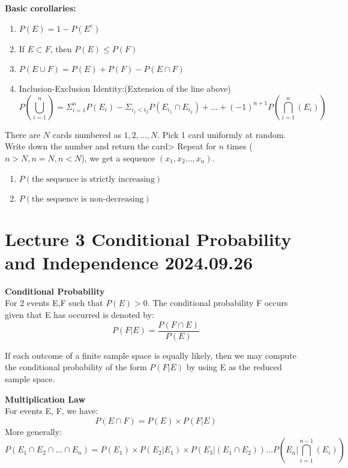 \documentclass{article}
\begin{document}
\begin{theorem}
    \textbf{Basic corollaries:}\\
    \begin{enumerate}
        \item $P(E) = 1 - P(E^c)$
        \item If $ E \subset F$, then $ P(E) \leq P(F)$
        \item $P(E \cup F) = P(E) + P(F) - P(E \cap F)$
        \item Inclusion-Exclusion Identity:(Extension of the line above)
        $$ P(\bigcup^n_{i=1}) = \Sigma^n_{i=1}P(E_i) - \Sigma_{i_1 < i_2}P(E_{i_1} \cap E_{i_2}) + \dots + (-1)^{n+1}P(\bigcap^n_{i=1}(E_i))$$
    \end{enumerate}
\end{theorem}

\begin{quiz}
    There are $N$ cards numbered as $1,2,\dots, N$. Pick 1 card uniformly at random. Write down the number and return the card> Repeat for $n$ times ($n > N, n = N, n < N$), we get a sequence $(x_1,x_2\dots, x_n)$.
    \begin{enumerate}
        \item $P(\text{the sequence is strictly increasing})$
        \item $P(\text{the sequence is non-decreasing})$
    \end{enumerate}
\end{quiz}



\section{Lecture 3 Conditional Probability and Independence 2024.09.26}
\begin{definition}
    \textbf{Conditional Probability}\\
    For 2 events E,F such that $P(E) > 0$. The conditional probability F occurs given that E has occurred is denoted by:
    $$ P(F|E) = \frac{P(F \cap E)}{P(E)}$$
\end{definition}

\begin{theorem}
    If each outcome of a finite sample space is equally likely, then we may compute the conditional probability of the form $P(F|E)$ by using E as the reduced sample space.
\end{theorem}

\begin{theorem}
    \textbf{Multiplication Law}\\
    For events E, F, we have:
    $$ P(E \cap F) = P(E)\times P(F|E)$$
    More generally:
    $$ P(E_1 \cap E_2 \cap \dots \cap E_n) = P(E_1)\times P(E_2|E_1)\times P(E_3|(E_1 \cap E_2))\dots P(E_n|\bigcap^{n-1}_{i=1}(E_i))$$
\end{theorem}
\end{document}
